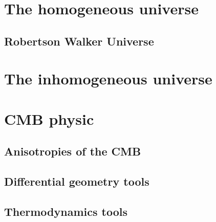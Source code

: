 \documentclass[12pt,a4paper]{book}
\begin{document}
\frontmatter 

\null\thispagestyle{empty}
\newpage

 
\tableofcontents

\mainmatter
\part{The homogeneous universe}
\chapter{Robertson Walker Universe}



\part{The inhomogeneous universe}

\part{CMB physic}
\chapter{Anisotropies of the CMB}




\appendix
\chapter{Differential geometry tools}

\chapter{Thermodynamics tools}


 
  
\end{document}
